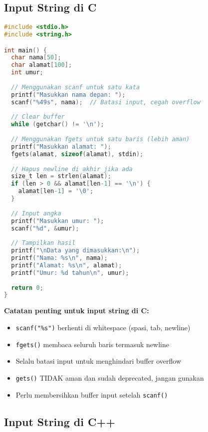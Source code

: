 \documentclass[../main.tex]{subfiles}
\begin{document}
\subsection{Input String di C}

\begin{lstlisting}[language=C, caption={Input string di C}]
#include <stdio.h>
#include <string.h>

int main() {
  char nama[50];
  char alamat[100];
  int umur;
  
  // Menggunakan scanf untuk satu kata
  printf("Masukkan nama depan: ");
  scanf("%49s", nama);  // Batasi input, cegah overflow
  
  // Clear buffer
  while (getchar() != '\n');
  
  // Menggunakan fgets untuk satu baris (lebih aman)
  printf("Masukkan alamat: ");
  fgets(alamat, sizeof(alamat), stdin);
  
  // Hapus newline di akhir jika ada
  size_t len = strlen(alamat);
  if (len > 0 && alamat[len-1] == '\n') {
    alamat[len-1] = '\0';
  }
  
  // Input angka
  printf("Masukkan umur: ");
  scanf("%d", &umur);
  
  // Tampilkan hasil
  printf("\nData yang dimasukkan:\n");
  printf("Nama: %s\n", nama);
  printf("Alamat: %s\n", alamat);
  printf("Umur: %d tahun\n", umur);
  
  return 0;
}
\end{lstlisting}

\textbf{Catatan penting untuk input string di C:}
\begin{itemize}
  \item \texttt{scanf("\%s")} berhenti di whitespace (spasi, tab, newline)
  \item \texttt{fgets()} membaca seluruh baris termasuk newline
  \item Selalu batasi input untuk menghindari buffer overflow
  \item \texttt{gets()} TIDAK aman dan sudah deprecated, jangan gunakan
  \item Perlu membersihkan buffer input setelah \texttt{scanf()}
\end{itemize}

\subsection{Input String di C++}
\end{document}
